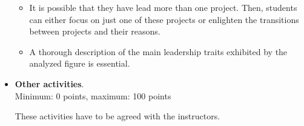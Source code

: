 \documentclass[a4paper]{article}
\begin{document}
\begin{itemize}
\begin{itemize}
   \item It is possible that they have lead more than one project. Then, students can either focus on just
   one of these projects or enlighten the transitions between projects and their reasons.
   \item A thorough description of the main leadership traits exhibited by the analyzed figure is essential.
  \end{itemize}


\item \textbf{Other activities}. \\
  Minimum: 0 points, maximum: 100 points

  These activities have to be agreed with the instructors.
\end{itemize}
\end{document}
